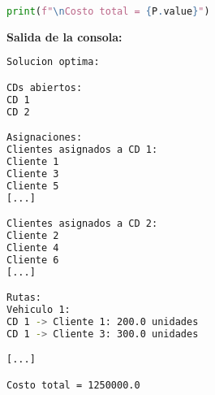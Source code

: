 \documentclass[12pt]{article}
\begin{document}
\begin{enumerate}
\begin{lstlisting}[language=Python]
print(f"\nCosto total = {P.value}")
\end{lstlisting}

\textbf{Salida de la consola:}
\begin{lstlisting}[language=bash,backgroundcolor=\color{black},basicstyle=\color{white}\ttfamily,numbers=none]
Solucion optima:

CDs abiertos:
CD 1
CD 2

Asignaciones:
Clientes asignados a CD 1:
Cliente 1
Cliente 3
Cliente 5
[...]

Clientes asignados a CD 2:
Cliente 2
Cliente 4
Cliente 6
[...]

Rutas:
Vehiculo 1:
CD 1 -> Cliente 1: 200.0 unidades
CD 1 -> Cliente 3: 300.0 unidades

[...]

Costo total = 1250000.0
\end{lstlisting}

\end{enumerate}
\end{document}
